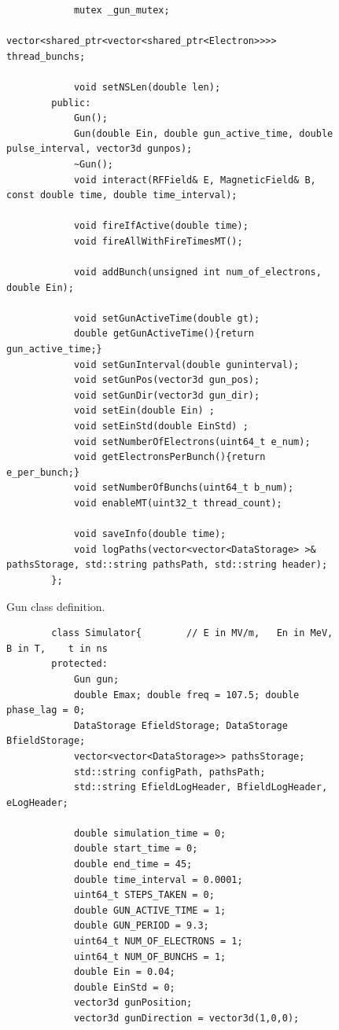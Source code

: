 \documentclass[a4paper,oneside,12pt]{report}
\numberwithin{equation}{chapter}
\begin{document}
{\begin{figure}[H]
\begin{verbatim}
            mutex _gun_mutex; 
            vector<shared_ptr<vector<shared_ptr<Electron>>>> thread_bunchs;

            void setNSLen(double len);
        public:
            Gun();
            Gun(double Ein, double gun_active_time, double pulse_interval, vector3d gunpos);
            ~Gun();
            void interact(RFField& E, MagneticField& B, const double time, double time_interval);

            void fireIfActive(double time);
            void fireAllWithFireTimesMT();
            
            void addBunch(unsigned int num_of_electrons, double Ein);

            void setGunActiveTime(double gt);
            double getGunActiveTime(){return gun_active_time;}
            void setGunInterval(double guninterval);
            void setGunPos(vector3d gun_pos);
            void setGunDir(vector3d gun_dir);
            void setEin(double Ein) ;
            void setEinStd(double EinStd) ;
            void setNumberOfElectrons(uint64_t e_num);
            void getElectronsPerBunch(){return e_per_bunch;}
            void setNumberOfBunchs(uint64_t b_num);
            void enableMT(uint32_t thread_count);
            
            void saveInfo(double time);
            void logPaths(vector<vector<DataStorage> >& pathsStorage, std::string pathsPath, std::string header);
        };
    \end{verbatim}
    \vspace{20pt}
    \caption{Gun class definition.}
    \label{fig:gun_class}
\end{figure}

\begin{figure}[H]
    \centering
    \begin{verbatim}
        class Simulator{        // E in MV/m,   En in MeV,   B in T,    t in ns
        protected:
            Gun gun;
            double Emax; double freq = 107.5; double phase_lag = 0; 
            DataStorage EfieldStorage; DataStorage BfieldStorage;
            vector<vector<DataStorage>> pathsStorage;
            std::string configPath, pathsPath;
            std::string EfieldLogHeader, BfieldLogHeader, eLogHeader;

            double simulation_time = 0;
            double start_time = 0;
            double end_time = 45;   
            double time_interval = 0.0001;
            uint64_t STEPS_TAKEN = 0;
            double GUN_ACTIVE_TIME = 1;         
            double GUN_PERIOD = 9.3;
            uint64_t NUM_OF_ELECTRONS = 1;
            uint64_t NUM_OF_BUNCHS = 1;
            double Ein = 0.04;
            double EinStd = 0;
            vector3d gunPosition;
            vector3d gunDirection = vector3d(1,0,0);


\end{verbatim}
\end{figure}}
\end{document}
